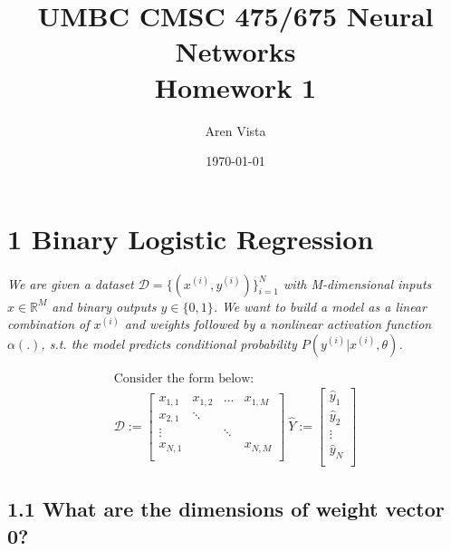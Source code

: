 \documentclass[11pt]{article}
\title{UMBC CMSC 475/675 Neural Networks  \\ Homework 1}
\author{ Aren Vista }
\date{\today}
\newcommand{\question}[1]{
    \begin{mdframed}[
        linecolor=gray,       %
        linewidth=0.5pt,      %
        innertopmargin=10pt,  %
        innerbottommargin=10pt %
    ]
    \centering \itshape #1
    \end{mdframed}
}
\theoremstyle{plain}
\begin{document}
\section*{1 Binary Logistic Regression   }
\question{We are given a dataset $\mathcal{D}=\{(x^{(i)},y^{(i)})\}_{i=1}^{N}$ with M-dimensional inputs $x\in\mathbb{R}^{M}$ and binary outputs $y\in\{0,1\}$.  We want to build a model as a linear combination of $x^{(i)}$ and weights followed by a nonlinear activation function $\alpha(.)$, s.t.  the model predicts conditional probability $P(y^{(i)}|x^{(i)},\theta)$.}
\[
	\begin{gathered}
		\text{Consider the form below: } \\
		\mathcal{D} :=
		\begin{bmatrix}
			x_{1,1} & x_{1,2} & ...    & x_{1,M} \\
			x_{2,1} & \ddots                     \\
			\vdots  &         & \ddots           \\
			x_{N,1} &         &        & x_{N,M} \\
		\end{bmatrix}
		~\hat{Y} :=
		\begin{bmatrix}
			\hat{y}_1 \\
			\hat{y}_2 \\
			\vdots    \\
			\hat{y}_N \\
		\end{bmatrix}
	\end{gathered}
\]
\subsection*{1.1 What are the dimensions of weight vector 0?}
\end{document}
